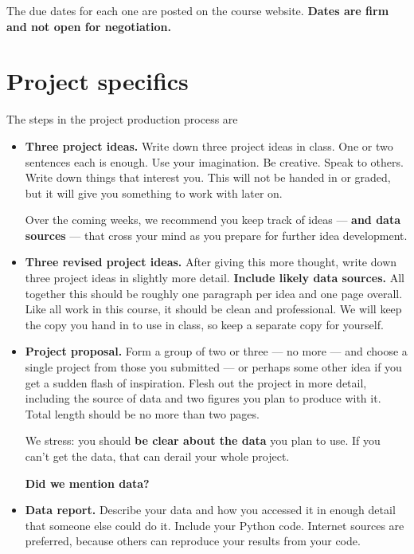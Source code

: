 \documentclass[11pt]{article}
\begin{document}
The due dates for each one are posted on the course website.
{\bf Dates are firm and not open for negotiation.}


\section*{Project specifics}

The steps in the project production process are
\begin{itemize}

\item {\bf Three project ideas.}
Write down three project ideas in class.
One or two sentences each is enough.
Use your imagination.  Be creative.  Speak to others.
Write down things that interest you.
This will not be handed in or graded, but it will give you something to work with later on.

Over the coming weeks, we recommend you keep track of ideas --- {\bf and data sources\/} 
--- that cross
your mind as you prepare for further idea development.


\item {\bf Three revised project ideas.}
After giving this more thought, write down three project ideas in slightly more detail.
{\bf Include likely data sources.}
All together this should be roughly one paragraph per idea and one page overall.
Like all work in this course, it should be clean and professional.
We will keep the copy you hand in to use in class, so keep a separate copy for yourself.

\item{\bf Project proposal.}
Form a group of two or three --- no more ---
and choose a single project from those you submitted ---
or perhaps some other idea if you get a sudden flash of inspiration.
Flesh out the project in more detail, including the source of data and
two figures you plan to produce with it.
Total length should be no more than two pages.

We stress:  you should {\bf be clear about the data} you plan to use.
If you can't get the data, that can derail your whole project.

{\bf Did we mention data?} 

\item {\bf Data report.}
Describe your data and how you accessed it in enough detail that someone else could do it.
Include your Python code.  %
Internet sources are preferred, because others can reproduce your results from your code.



\end{itemize}
\end{document}
